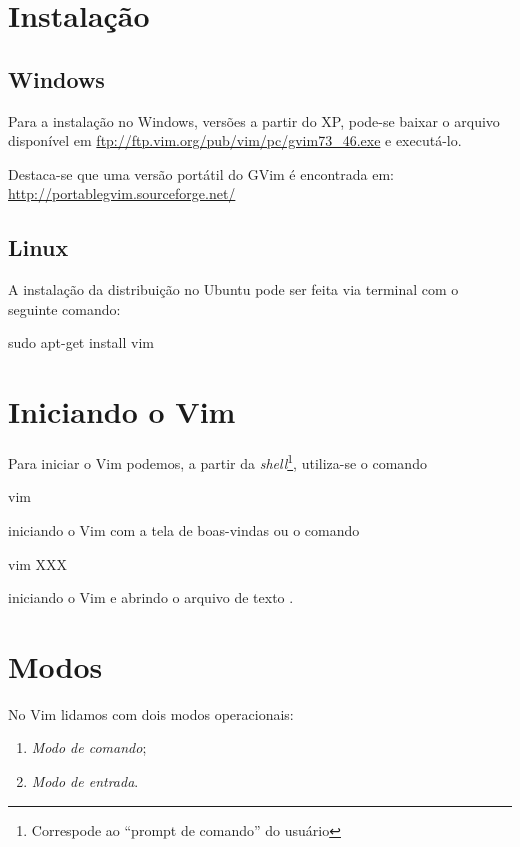 \section{Instalação}
\subsection{Windows}

Para a instalação no Windows, versões a partir do XP, pode-se baixar o arquivo disponível em \url{ftp://ftp.vim.org/pub/vim/pc/gvim73_46.exe} e executá-lo.

Destaca-se que uma versão portátil do GVim é encontrada em: \url{http://portablegvim.sourceforge.net/}

\subsection{Linux}

A instalação da distribuição no Ubuntu pode ser feita via terminal com o seguinte comando:
\begin{code}
    sudo apt-get install vim
\end{code}

\section{Iniciando o Vim}

Para iniciar o Vim podemos, a partir da \textit{shell}\footnote{Correspode ao ``prompt de comando'' do usuário}, utiliza-se o comando
\begin{code}
    vim
\end{code}
iniciando o Vim com a tela de boas-vindas ou o comando
\begin{code}
    vim XXX
\end{code}
iniciando o Vim e abrindo o arquivo de texto .

\section{Modos}

No Vim lidamos com dois modos operacionais:
\begin{enumerate}
    \item \textit{Modo de comando};
    \item \textit{Modo de entrada}.
\end{enumerate}


